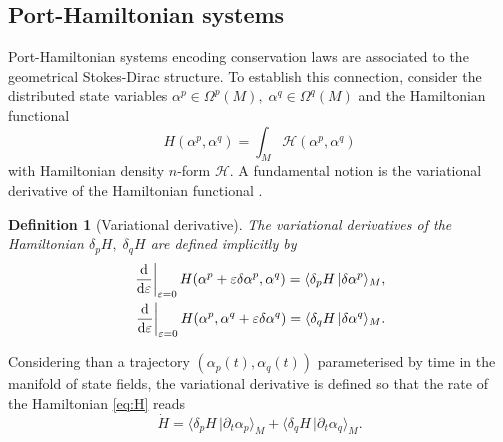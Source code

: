 \documentclass{elsarticle}
\newtheorem{definition}{Definition}
\newcommand{\dualpr}[3][]{\ensuremath{\langle #2 \, \vert #3 \rangle_{#1}}}
\begin{document}
\subsection{Port-Hamiltonian systems}
Port-Hamiltonian systems encoding conservation laws are associated to the geometrical Stokes-Dirac structure. To establish this connection, consider the distributed state variables $\alpha^p
\in \Omega^p(M), \; \alpha^q
\in \Omega^q(M)$ and the Hamiltonian functional 
\begin{equation}\label{eq:H}
H(\alpha^p
, \alpha^q
) = \int_M
\mathcal{H}(\alpha^p
, \alpha^q
)
\end{equation}
with Hamiltonian density $n$-form $\mathcal{H}$. A fundamental notion is the variational derivative of the Hamiltonian functional \cite{olver1986applications, vanderSchaft2002}. 
\begin{definition}[Variational derivative]\label{def:var_der}
The variational derivatives of the Hamiltonian $\delta_{p} H, \; \delta_{q} H$ are defined implicitly by
\begin{equation*}
\begin{aligned}
    \left.\diff{}{\varepsilon}\right|_{\varepsilon = 0} H(\alpha^p + \varepsilon \delta \alpha^p, \alpha^q) = \dualpr[M]{\delta_{p} H}{\delta \alpha^p}, \\
    \left.\diff{}{\varepsilon}\right|_{\varepsilon = 0} H(\alpha^p, \alpha^q + \varepsilon \delta \alpha^q) = \dualpr[M]{\delta_{q} H}{\delta \alpha^q}.
\end{aligned}
\end{equation*}
\end{definition}

Considering than a trajectory $(\alpha_p(t),\alpha_q(t))$ parameterised by time in the manifold of state fields, the variational derivative is defined so that the rate of the Hamiltonian \eqref{eq:H} reads
\begin{equation}\label{eq:H_dot}
    \dot{H} = \dualpr[M]{\delta_{p} H}{\partial_t \alpha_p} + \dualpr[M]{\delta_{q} H}{\partial_t \alpha_q}.
\end{equation}
\end{document}
